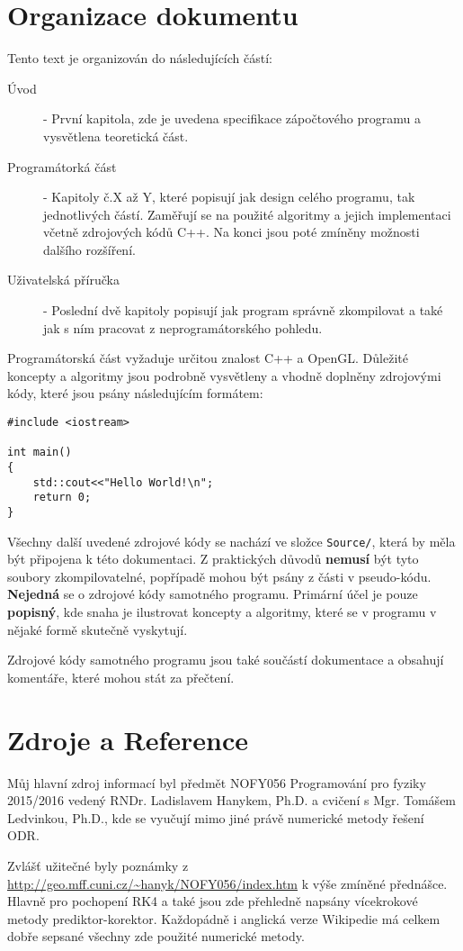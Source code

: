 
\chapter*{Organizace dokumentu}
Tento text je organizován do následujících částí:
\begin{description}
	\item[Úvod] - První kapitola, zde je uvedena specifikace zápočtového programu a vysvětlena teoretická část.
	\item[Programátorká část] - Kapitoly č.X až Y, které popisují jak design celého programu, tak jednotlivých částí. Zaměřují se na použité algoritmy a jejich implementaci včetně zdrojových kódů C++. Na konci jsou poté zmíněny možnosti dalšího rozšíření.
	\item[Uživatelská příručka] - Poslední dvě kapitoly popisují jak program správně zkompilovat a také jak s ním pracovat z neprogramátorského pohledu.
	
\end{description}
Programátorská část vyžaduje určitou znalost C++ a OpenGL. Důležité koncepty a algoritmy jsou podrobně vysvětleny a vhodně doplněny zdrojovými kódy, které jsou psány následujícím formátem:
\begin{lstlisting}[title=Text vystihující příklad (Název souboru)]
#include <iostream>

int main()
{
	std::cout<<"Hello World!\n";
	return 0;
}
\end{lstlisting}
Všechny další uvedené zdrojové kódy se nachází ve složce \texttt{Source/}, která
by měla být připojena k této dokumentaci. Z praktických důvodů \textbf{nemusí} být tyto soubory zkompilovatelné, popřípadě mohou být psány z části v pseudo-kódu. \textbf{Nejedná} se o zdrojové kódy samotného programu. Primární účel je pouze \textbf{popisný}, kde snaha je ilustrovat koncepty a algoritmy, které se v programu v nějaké formě skutečně vyskytují.

Zdrojové kódy samotného programu jsou také součástí dokumentace a obsahují komentáře, které mohou stát za přečtení.

\chapter*{Zdroje a Reference}
Můj hlavní zdroj informací byl předmět NOFY056 Programování pro fyziky 2015/2016 vedený RNDr. Ladislavem Hanykem, Ph.D. a cvičení s Mgr. Tomášem Ledvinkou, Ph.D., kde se vyučují mimo jiné právě numerické metody řešení ODR. 

Zvlášť užitečné byly poznámky z \url{http://geo.mff.cuni.cz/~hanyk/NOFY056/index.htm} k výše zmíněné přednášce. Hlavně pro pochopení RK4 a také jsou zde přehledně napsány vícekrokové metody prediktor-korektor. Každopádně i anglická verze Wikipedie má celkem dobře sepsané všechny zde použité numerické metody.
